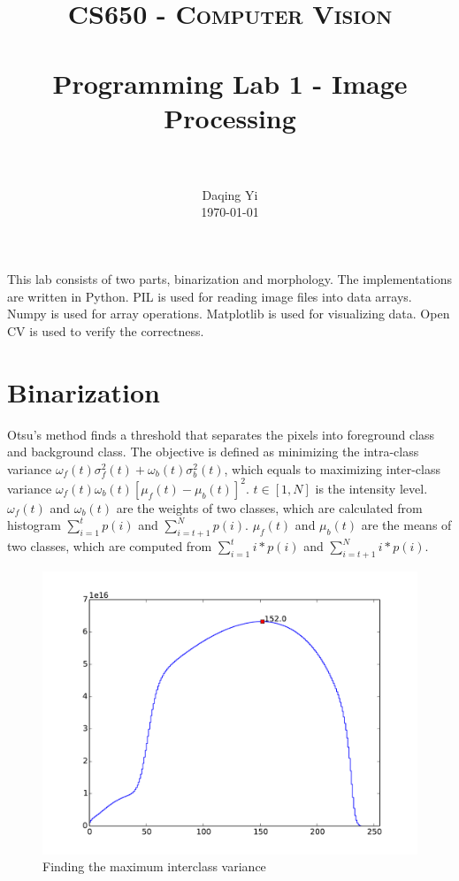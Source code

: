 \documentclass[paper=a4, fontsize=11pt]{scrartcl}
\title{
		\usefont{OT1}{bch}{b}{n}
		\normalfont \normalsize \textsc{CS650 - Computer Vision} \\ [25pt]
		\horrule{0.5pt} \\[0.4cm]
		\huge Programming Lab 1 - Image Processing \\
		\horrule{2pt} \\[0.5cm]
}
\author{
		\normalfont 								\normalsize
        Daqing Yi\\[-3pt]		\normalsize
        \today
}
\date{}
\numberwithin{equation}{section}		%
\numberwithin{figure}{section}			%
\numberwithin{table}{section}				%
\begin{document}
\maketitle




This lab consists of two parts, binarization and morphology.
The implementations are written in Python.
PIL is used for reading image files into data arrays.
Numpy is used for array operations.
Matplotlib is used for visualizing data.
Open CV is used to verify the correctness.

\section{Binarization}

Otsu's method finds a threshold that separates the pixels into foreground class and background class.
The objective is defined as minimizing the intra-class variance $ \omega_{f} (t) \sigma_{f}^{2} (t) + \omega_{b} (t) \sigma_{b}^{2} (t) $, which equals to maximizing inter-class variance $ \omega_{f} (t) \omega_{b} (t) [ \mu_{f} (t) - \mu_{b} (t) ]^{2} $.
$ t \in [1, N] $ is the intensity level.
$ \omega_{f} (t) $ and $ \omega_{b} (t) $ are the weights of two classes, which are calculated from histogram $ \sum_{i=1}^{t} p(i) $ and $ \sum_{i=t+1}^{N} p(i) $.
$ \mu_{f} (t) $ and $ \mu_{b} (t) $ are the means of two classes, which are computed from $ \sum_{i=1}^{t} i * p(i) $ and $ \sum_{i=t+1}^{N} i * p(i) $.

\begin{figure}
\centering
\includegraphics[width=0.5\linewidth]{./figure/interclass_variances}
\caption{Finding the maximum interclass variance}
\label{fig:interclass_variances}
\end{figure}
\end{document}
